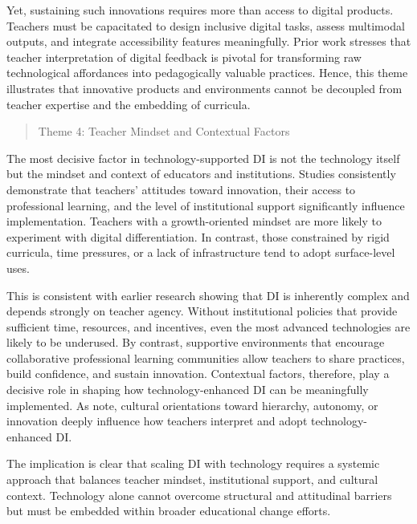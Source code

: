 \documentclass[english]{textolivre}
\begin{document}
Yet, sustaining such innovations requires more than access to digital products. Teachers must be capacitated to design inclusive digital tasks, assess multimodal outputs, and integrate accessibility features meaningfully. Prior work \cite{molenaar2019, pozdniakov2025} stresses that teacher interpretation of digital feedback is pivotal for transforming raw technological affordances into pedagogically valuable practices. Hence, this theme illustrates that innovative products and environments cannot be decoupled from teacher expertise and the embedding of curricula.

\begin{quote}
    Theme 4: Teacher Mindset and Contextual Factors
\end{quote}
The most decisive factor in technology-supported DI is not the technology itself but the mindset and context of educators and institutions. Studies \cite{halil2024, hasanah2023, shareefa2024, yuen2023} consistently demonstrate that teachers’ attitudes toward innovation, their access to professional learning, and the level of institutional support significantly influence implementation. Teachers with a growth-oriented mindset \cite{dweck2006} are more likely to experiment with digital differentiation. In contrast, those constrained by rigid curricula, time pressures, or a lack of infrastructure tend to adopt surface-level uses.

This is consistent with earlier research \cite{smalejacobse2019, vangeel2019} showing that DI is inherently complex and depends strongly on teacher agency. Without institutional policies that provide sufficient time, resources, and incentives, even the most advanced technologies are likely to be underused. By contrast, supportive environments that encourage collaborative professional learning communities \cite{darlinghammond2020} allow teachers to share practices, build confidence, and sustain innovation. Contextual factors, therefore, play a decisive role in shaping how technology-enhanced DI can be meaningfully implemented. As \textcite{li2021} note, cultural orientations toward hierarchy, autonomy, or innovation deeply influence how teachers interpret and adopt technology-enhanced DI.

The implication is clear that scaling DI with technology requires a systemic approach that balances teacher mindset, institutional support, and cultural context. Technology alone cannot overcome structural and attitudinal barriers but must be embedded within broader educational change efforts.
\end{document}
